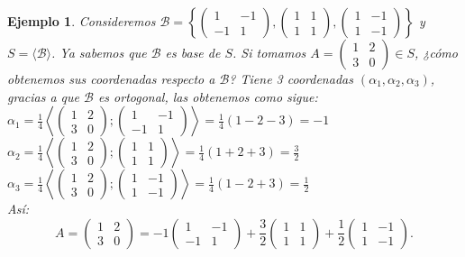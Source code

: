 \documentclass[12pt]{book}
\newtheorem{ejem}{Ejemplo}
\def\B{\mathcal{B}}
\begin{document}
{\begin{ejem} {\em
Consideremos $\B=\left\{\left(\begin{array}{rr} 1&-1\\-1&1\end{array}\right), \left(\begin{array}{rr} 1&1\\1&1\end{array}\right),\left(\begin{array}{rr} 1&-1\\1&-1\end{array}\right)\right\}$ y $S=\langle\B\rangle$.
Ya sabemos que $\B$ es base de $S$.
Si tomamos $A=\left(\begin{array}{rr} 1&2\\3&0\end{array}\right)\in S$, ¿cómo obtenemos sus coordenadas respecto a $\B$?
Tiene 3 coordenadas $(\alpha_1,\alpha_2,\alpha_3)$, gracias a que $\B$ es ortogonal, las obtenemos como sigue:
$\alpha_1=\frac{1}{4}\left\langle \left(\begin{array}{rr} 1&2\\3&0\end{array}\right);\left(\begin{array}{rr} 1&-1\\-1&1\end{array}\right)\right\rangle=\frac{1}{4}(1-2-3)=-1$\\
$\alpha_2=\frac{1}{4}\left\langle \left(\begin{array}{rr} 1&2\\3&0\end{array}\right);\left(\begin{array}{rr} 1&1\\1&1\end{array}\right)\right\rangle=\frac{1}{4}(1+2+3)=\frac{3}{2}$\\
$\alpha_3=\frac{1}{4}\left\langle \left(\begin{array}{rr} 1&2\\3&0\end{array}\right);\left(\begin{array}{rr} 1&-1\\1&-1\end{array}\right)\right\rangle=\frac{1}{4}(1-2+3)=\frac{1}{2}$\\
Así:
$$A=\left(\begin{array}{rr} 1&2\\3&0\end{array}\right)=
-1\left(\begin{array}{rr} 1&-1\\-1&1\end{array}\right)
+\frac{3}{2} \left(\begin{array}{rr} 1&1\\1&1\end{array}\right)
+\frac{1}{2}\left(\begin{array}{rr} 1&-1\\1&-1\end{array}\right).$$
}
\end{ejem}


}
\end{document}
